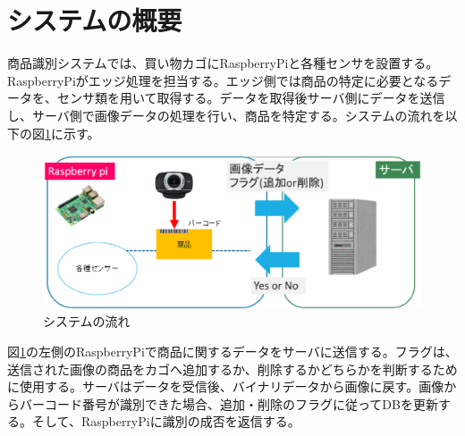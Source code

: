 \section{システムの概要}
商品識別システムでは、買い物カゴにRaspberryPiと各種センサを設置する。RaspberryPiがエッジ処理を担当する。エッジ側では商品の特定に必要となるデータを、センサ類を用いて取得する。データを取得後サーバ側にデータを送信し、サーバ側で画像データの処理を行い、商品を特定する。システムの流れを以下の図\ref{system_summary}に示す。


\begin{figure}[htbp]
\centering
\includegraphics[width=12cm]{./pic/summary.eps}
\caption{システムの流れ}
\label{system_summary}
\end{figure}

図\ref{system_summary}の左側のRaspberryPiで商品に関するデータをサーバに送信する。フラグは、送信された画像の商品をカゴへ追加するか、削除するかどちらかを判断するために使用する。サーバはデータを受信後、バイナリデータから画像に戻す。画像からバーコード番号が識別できた場合、追加・削除のフラグに従ってDBを更新する。そして、RaspberryPiに識別の成否を返信する。